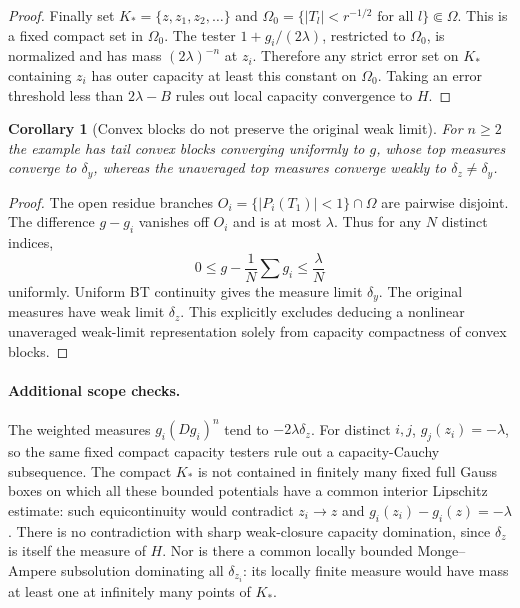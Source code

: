 \documentclass[11pt,a4paper]{article}
\numberwithin{equation}{section}
\newtheorem{corollary}[theorem]{Corollary}
\theoremstyle{definition}
\theoremstyle{remark}
\begin{document}
\begin{proof}
Finally set
$K_*=\{z,z_1,z_2,\ldots\}$ and
$\Omega_0=\{|T_l|<r^{-1/2}\text{ for all }l\}\Subset\Omega$.
This is a fixed compact set in $\Omega_0$. The tester
$1+g_i/(2\lambda)$, restricted to $\Omega_0$, is normalized and
has mass $(2\lambda)^{-n}$ at $z_i$. Therefore any strict error
set on $K_*$ containing $z_i$ has outer capacity at least this
constant on $\Omega_0$. Taking an error threshold less than
$2\lambda-B$ rules out local capacity convergence to $H$.
\end{proof}

\begin{corollary}[Convex blocks do not preserve the original weak limit]
\label{cor:r3-moving-convex-block-mismatch}
For $n\geq2$ the example has tail convex blocks converging
uniformly to $g$, whose top measures converge to $\delta_y$,
whereas the unaveraged top measures converge weakly to
$\delta_z\ne\delta_y$.
\end{corollary}

\begin{proof}
The open residue branches
$O_i=\{|P_i(T_1)|<1\}\cap\Omega$ are pairwise disjoint.
The difference $g-g_i$ vanishes off $O_i$ and is at most
$\lambda$. Thus for any $N$ distinct indices,
\[
 0\leq g-\frac1N\sum g_i\leq\frac{\lambda}{N}
\]
uniformly. Uniform BT continuity gives the measure limit
$\delta_y$. The original measures have weak limit $\delta_z$.
This explicitly excludes deducing a nonlinear unaveraged
weak-limit representation solely from capacity compactness
of convex blocks.
\end{proof}

\paragraph{Additional scope checks.}
The weighted measures $g_i(Dg_i)^n$ tend to $-2\lambda\delta_z$.
For distinct $i,j$, $g_j(z_i)=-\lambda$, so the same fixed
compact capacity testers rule out a capacity-Cauchy subsequence.
The compact $K_*$ is not contained in finitely many fixed full
Gauss boxes on which all these bounded potentials have a common
interior Lipschitz estimate: such equicontinuity would contradict
$z_i\to z$ and $g_i(z_i)-g_i(z)=-\lambda$.
There is no contradiction with sharp weak-closure capacity
domination, since $\delta_z$ is itself the measure of $H$.
Nor is there a common locally bounded Monge--Ampere subsolution
dominating all $\delta_{z_i}$: its locally finite measure would
have mass at least one at infinitely many points of $K_*$.
\end{document}
